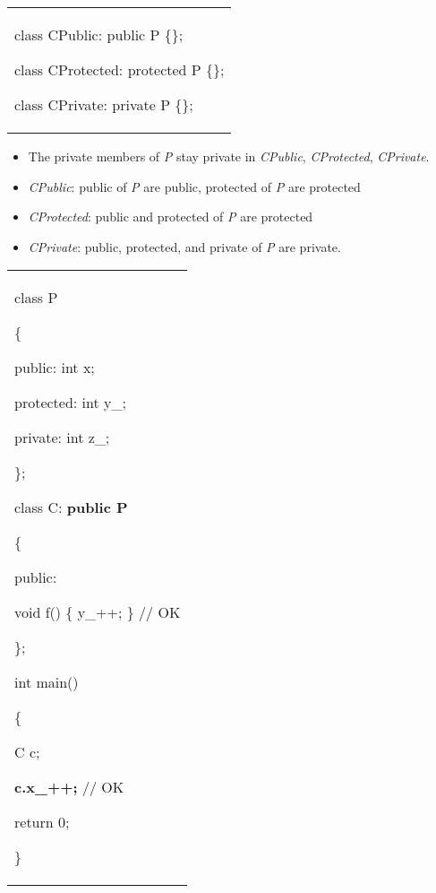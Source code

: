 \documentclass[
]{article}
\providecommand{\tightlist}{%
  \setlength{\itemsep}{0pt}\setlength{\parskip}{0pt}}
\begin{document}
\begin{longtable}[]{@{}
  >{\raggedright\arraybackslash}p{}@{}}
\toprule\noalign{}
 \\
\midrule\noalign{}
\endhead
\bottomrule\noalign{}
\endlastfoot
class CPublic: public P \{\};

class CProtected: protected P \{\};

class CPrivate: private P \{\}; \\
\end{longtable}

\begin{itemize}
\tightlist
\item
  The private members of \emph{P} stay private in \emph{CPublic},
  \emph{CProtected}, \emph{CPrivate}.
\item
  \emph{CPublic}: public of \emph{P} are public, protected of \emph{P}
  are protected
\item
  \emph{CProtected}: public and protected of \emph{P} are protected
\item
  \emph{CPrivate}: public, protected, and private of \emph{P} are
  private.
\end{itemize}

\begin{longtable}[]{@{}
  >{\raggedright\arraybackslash}p{}@{}}
\toprule\noalign{}
 \\
\midrule\noalign{}
\endhead
\bottomrule\noalign{}
\endlastfoot
class P

\{

public: int x;

protected: int y\_;

private: int z\_;

\};

class C: \textbf{public P}

\{

public:

void f() \{ y\_++; \} // OK

\};

int main()

\{

C c;

\textbf{c.x\_++;} // OK

return 0;

\} \\
\end{longtable}
\end{document}

